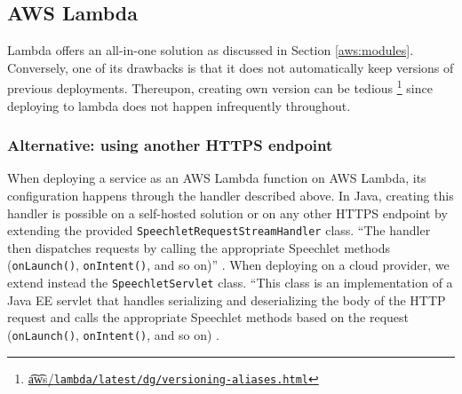 \subsection*{AWS Lambda}

Lambda offers an all-in-one solution as discussed in Section \ref{aws:modules}. Conversely, one of its drawbacks is that it does not automatically keep versions of previous deployments. 
Thereupon, creating own version can be tedious \footnote{\href{https://docs.aws.amazon.com/lambda/latest/dg/versioning-aliases.html}{\t{a\t{ws}}/\lstinline|lambda/latest/dg/versioning-aliases.html|}} since deploying to lambda does not happen infrequently throughout. %


\subsubsection*{Alternative: using another HTTPS endpoint}

When deploying a service as an AWS Lambda function on AWS Lambda, its configuration happens through the handler described above. In Java, creating this handler is possible on a self-hosted solution or on any other HTTPS endpoint by extending the provided \texttt{SpeechletRequestStreamHandler} class. ``The handler then dispatches requests by calling the appropriate Speechlet methods (\texttt{onLaunch()}, \texttt{onIntent()}, and so on)'' \cite{aws_website}.
When deploying on a cloud provider, we extend instead the \texttt{SpeechletServlet} class. ``This class is an implementation of a Java EE servlet that handles serializing and deserializing the body of the HTTP request and calls the appropriate Speechlet methods based on the request (\texttt{onLaunch()}, \texttt{onIntent()}, and so on) \cite{aws_website}.




